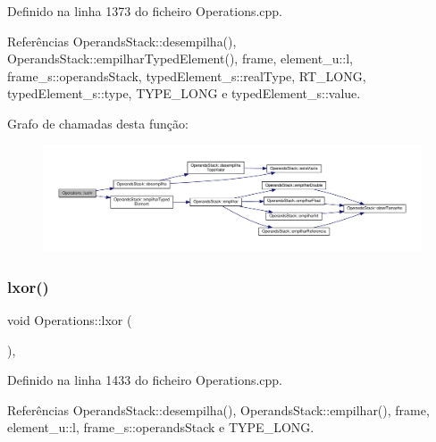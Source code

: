 Definido na linha 1373 do ficheiro Operations.\+cpp.



Referências Operands\+Stack\+::desempilha(), Operands\+Stack\+::empilhar\+Typed\+Element(), frame, element\+\_\+u\+::l, frame\+\_\+s\+::operands\+Stack, typed\+Element\+\_\+s\+::real\+Type, R\+T\+\_\+\+L\+O\+NG, typed\+Element\+\_\+s\+::type, T\+Y\+P\+E\+\_\+\+L\+O\+NG e typed\+Element\+\_\+s\+::value.

Grafo de chamadas desta função\+:\nopagebreak
\begin{figure}[H]
\begin{center}
\leavevmode
\includegraphics[width=350pt]{classOperations_a3b7c61f8bca7b3ad0dacae6649aee042_cgraph}
\end{center}
\end{figure}
\mbox{\label{classOperations_ac135e723f1ac6a27c736e6b8e7d06a45}} 
\subsubsection{\texorpdfstring{lxor()}{lxor()}}
{\footnotesize\ttfamily void Operations\+::lxor (\begin{DoxyParamCaption}{ }\end{DoxyParamCaption})\hspace{0.3cm}{\ttfamily [static]}, {\ttfamily [private]}}



Definido na linha 1433 do ficheiro Operations.\+cpp.



Referências Operands\+Stack\+::desempilha(), Operands\+Stack\+::empilhar(), frame, element\+\_\+u\+::l, frame\+\_\+s\+::operands\+Stack e T\+Y\+P\+E\+\_\+\+L\+O\+NG.

